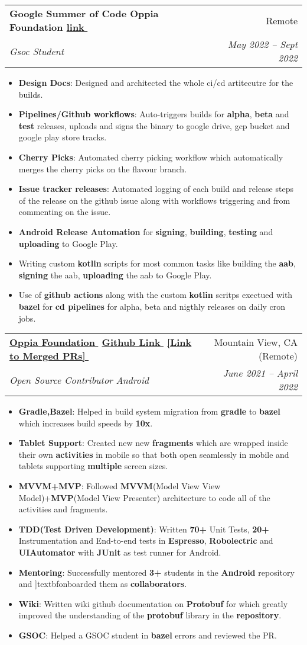 \documentclass[letterpaper,1pt]{article}
\makeatletter
\let\orighref\href
\renewcommand{\href}[2]{\orighref{#1}{#2\,\faExternalLink}}
\newcommand{\resumeItem}[2]{
  \item\small{
    \textbf{#1}{: #2 \vspace{-2pt}}
  }
}
\newcommand{\resumeSubheading}[4]{
  \vspace{-1pt}\item
    \begin{tabular*}{0.97\textwidth}{l@{\extracolsep{\fill}}r}
      \textbf{#1} & #2 \\
      \textit{\small#3} & \textit{\small #4} \\
    \end{tabular*}\vspace{-5pt}
}
\newcommand{\resumeItemListStart}{\begin{itemize}}
\newcommand{\resumeItemListEnd}{\end{itemize}\vspace{-5pt}}
\makeatother
\begin{document}
\resumeSubheading
{Google Summer of Code Oppia Foundation \href{https://docs.google.com/document/d/150Yk14Cxmy8OAbSSwgP1aXDBLo1b8HtuIhmrRhzEWU4/edit}{link}}{Remote}
{Gsoc Student}{May 2022 -- Sept 2022}
\resumeItemListStart
\resumeItem{Design Docs}{Designed and architected the whole ci/cd artitecutre for the builds. }
\resumeItem{Pipelines/Github workflows}{Auto-triggers builds for \textbf{alpha}, \textbf{beta} and \textbf{test} releases, uploads and signs the binary to google drive, gcp bucket and google play store tracks.}
\resumeItem{Cherry Picks}{Automated cherry picking workflow which automatically merges the cherry picks on the flavour branch.}
\resumeItem{Issue tracker releases}{Automated logging of each build and release steps of the release on the github issue along with workflows triggering and from commenting on the issue.}
\resumeItemListEnd
\begin{itemize}
  \item \textbf{Android Release Automation} for \textbf{signing}, \textbf{building}, \textbf{testing} and \textbf{uploading} to Google Play.
  \item Writing custom \textbf{kotlin} scripts for most common tasks like building the \textbf{aab}, \textbf{signing} the aab, \textbf{uploading} the aab to Google Play.
  \item Use of \textbf{github actions} along with the custom \textbf{kotlin} scritps exectued with \textbf{bazel} for \textbf{cd pipelines} for alpha, beta and nigthly releases on daily cron jobs.
\end{itemize}


\resumeSubheading
{\href{https://oppia.org}{Oppia Foundation} \href{https://github.com/oppia/oppia-android}{Github Link} \href{https://github.com/oppia/oppia-android/commits?author=yash10019coder}{[Link to Merged PRs]}}{Mountain View, CA (Remote)}
{Open Source Contributor Android}{June 2021 -- April 2022}
\resumeItemListStart
\resumeItem{Gradle,Bazel}
{Helped in build system migration from \textbf{gradle} to \textbf{bazel} which increases build speeds by \textbf{10x}.}
\resumeItem{Tablet Support}
{Created new new \textbf{fragments} which are wrapped inside their own \textbf{activities} in mobile so that both open seamlessly in mobile and tablets supporting \textbf{multiple} screen sizes. }
\resumeItem{MVVM+MVP}
{Followed \textbf{MVVM}(Model View View Model)+\textbf{MVP}(Model View Presenter) architecture to code all of the activities and fragments.}
\resumeItem{TDD(Test Driven Development)}
{Written \textbf{70+} Unit Tests, \textbf{20+} Instrumentation and End-to-end tests in \textbf{Espresso}, \textbf{Robolectric} and \textbf{UIAutomator} with \textbf{JUnit} as test runner for Android.}
\resumeItem{Mentoring}{Successfully mentored \textbf{3+} students in the \textbf{Android} repository and ]textbf{onboarded} them as \textbf{collaborators}.}
\resumeItem{Wiki}{Written wiki github documentation on \textbf{Protobuf} for which greatly improved the understanding of the \textbf{protobuf} library in the \textbf{repository}.}
\resumeItem{GSOC}{Helped a GSOC student in \textbf{bazel} errors and reviewed the PR.}
\resumeItemListEnd
\end{document}
